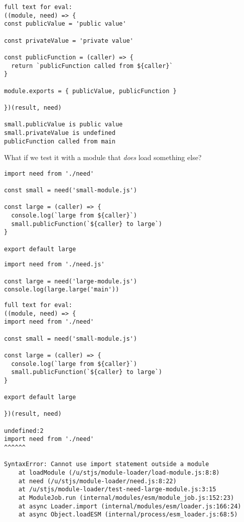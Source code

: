 \documentclass[krantzl]{krantz}
\begin{document}
\begin{lstlisting}[frame=single,frameround=tttt]
full text for eval:
((module, need) => {
const publicValue = 'public value'

const privateValue = 'private value'

const publicFunction = (caller) => {
  return `publicFunction called from ${caller}`
}

module.exports = { publicValue, publicFunction }

})(result, need)

small.publicValue is public value
small.privateValue is undefined
publicFunction called from main
\end{lstlisting}



What if we test it with a module that \emph{does} load something else?


\begin{lstlisting}[frame=single,frameround=tttt]
import need from './need'

const small = need('small-module.js')

const large = (caller) => {
  console.log(`large from ${caller}`)
  small.publicFunction(`${caller} to large`)
}

export default large
\end{lstlisting}



\begin{lstlisting}[frame=single,frameround=tttt]
import need from './need.js'

const large = need('large-module.js')
console.log(large.large('main'))
\end{lstlisting}



\begin{lstlisting}[frame=single,frameround=tttt]
full text for eval:
((module, need) => {
import need from './need'

const small = need('small-module.js')

const large = (caller) => {
  console.log(`large from ${caller}`)
  small.publicFunction(`${caller} to large`)
}

export default large

})(result, need)

undefined:2
import need from './need'
^^^^^^

SyntaxError: Cannot use import statement outside a module
    at loadModule (/u/stjs/module-loader/load-module.js:8:8)
    at need (/u/stjs/module-loader/need.js:8:22)
    at /u/stjs/module-loader/test-need-large-module.js:3:15
    at ModuleJob.run (internal/modules/esm/module_job.js:152:23)
    at async Loader.import (internal/modules/esm/loader.js:166:24)
    at async Object.loadESM (internal/process/esm_loader.js:68:5)
\end{lstlisting}
\end{document}
